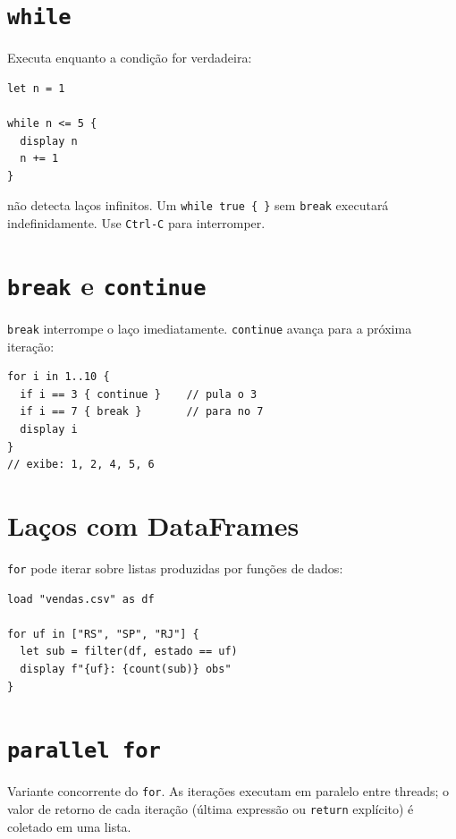 \section{\texttt{while}}

Executa enquanto a condição for verdadeira:

\begin{lstlisting}[caption={while básico}]
let n = 1

while n <= 5 {
  display n
  n += 1
}
\end{lstlisting}

\begin{aviso}
  \hayashi{} não detecta laços infinitos. Um \lstinline|while true { }| sem
  \lstinline{break} executará indefinidamente. Use \texttt{Ctrl-C} para interromper.
\end{aviso}

\section{\texttt{break} e \texttt{continue}}

\lstinline{break} interrompe o laço imediatamente. \lstinline{continue} avança para
a próxima iteração:

\begin{lstlisting}[caption={break e continue}]
for i in 1..10 {
  if i == 3 { continue }    // pula o 3
  if i == 7 { break }       // para no 7
  display i
}
// exibe: 1, 2, 4, 5, 6
\end{lstlisting}

\section{Laços com DataFrames}

\lstinline{for} pode iterar sobre listas produzidas por funções de dados:

\begin{lstlisting}[caption={Iterando sobre grupos}]
load "vendas.csv" as df

for uf in ["RS", "SP", "RJ"] {
  let sub = filter(df, estado == uf)
  display f"{uf}: {count(sub)} obs"
}
\end{lstlisting}

\section{\texttt{parallel for}}

Variante concorrente do \texttt{for}. As iterações executam em paralelo
entre threads; o valor de retorno de cada iteração (última expressão ou
\texttt{return} explícito) é coletado em uma lista.

